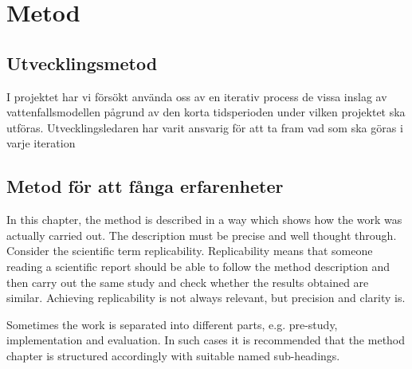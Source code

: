 \chapter{Metod}
\label{cha:method}

\section{Utvecklingsmetod}
I projektet har vi försökt använda oss av en iterativ process de vissa inslag av vattenfallsmodellen pågrund av den korta tidsperioden under vilken projektet ska utföras. Utvecklingsledaren har varit ansvarig för att ta fram vad som ska göras i varje iteration 

\section{Metod för att fånga erfarenheter}

In this chapter, the method is described in a way which shows how the
work was actually carried out. The description must be precise and
well thought through. Consider the scientific term
replicability. Replicability means that someone reading a scientific
report should be able to follow the method description and then carry
out the same study and check whether the results obtained are
similar. Achieving replicability is not always relevant, but precision
and clarity is.

Sometimes the work is separated into different parts, e.g.  pre-study,
implementation and evaluation. In such cases it is recommended that
the method chapter is structured accordingly with suitable named
sub-headings.

